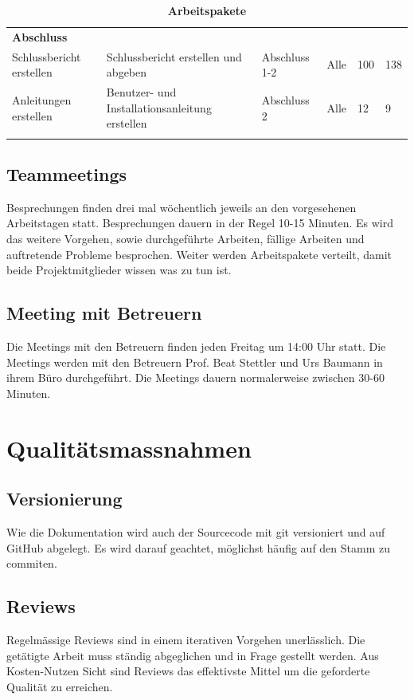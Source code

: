 \begin{landscape}
\begin{longtable}{ p{5.5cm} p{8cm} l l p{1cm} p{1cm} }
\textbf{Abschluss}&&&&\\ \addlinespace
Schlussbericht erstellen & Schlussbericht erstellen und abgeben & Abschluss 1-2 & Alle & 100 & 138\\ \addlinespace
Anleitungen erstellen & Benutzer- und Installationsanleitung erstellen & Abschluss 2 & Alle & 12 & 9\\ \addlinespace


\addlinespace


\hline\caption{\textbf{Arbeitspakete}}
\end{longtable}
\end{landscape}

\subsection{Teammeetings}
Besprechungen finden drei mal wöchentlich jeweils an den vorgesehenen Arbeitstagen statt. 
Besprechungen dauern in der Regel 10-15 Minuten. Es wird das weitere Vorgehen, sowie durchgeführte Arbeiten, fällige Arbeiten und auftretende Probleme besprochen. Weiter werden Arbeitspakete verteilt, damit beide Projektmitglieder wissen was zu tun ist. 

\subsection{Meeting mit Betreuern}
Die Meetings mit den Betreuern finden jeden Freitag um 14:00 Uhr statt. 
Die Meetings werden mit den Betreuern Prof. Beat Stettler und Urs Baumann in ihrem Büro durchgeführt. Die Meetings dauern normalerweise zwischen 30-60 Minuten. 

\section{Qualitätsmassnahmen}
\subsection{Versionierung}
Wie die Dokumentation wird auch der Sourcecode mit git versioniert und auf GitHub abgelegt. Es wird darauf geachtet, möglichst häufig auf den Stamm zu commiten.
\subsection{Reviews}
Regelmässige Reviews sind in einem iterativen Vorgehen unerlässlich. Die getätigte Arbeit muss ständig abgeglichen und in Frage gestellt werden. Aus Kosten-Nutzen Sicht sind Reviews das effektivste Mittel um die geforderte Qualität zu erreichen.\\ 

